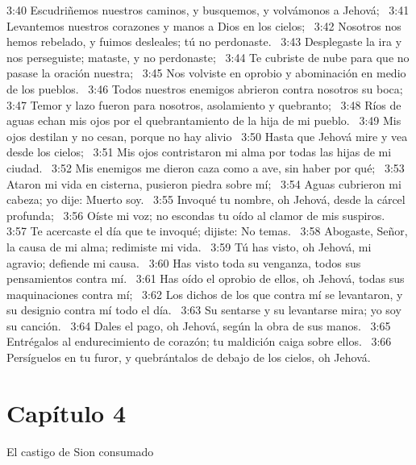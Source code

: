 3:40 Escudriñemos nuestros caminos, y busquemos, y volvámonos a Jehová;  
3:41 Levantemos nuestros corazones y manos a Dios en los cielos;  
3:42 Nosotros nos hemos rebelado, y fuimos desleales; tú no perdonaste.  
3:43 Desplegaste la ira y nos perseguiste; mataste, y no perdonaste;  
3:44 Te cubriste de nube para que no pasase la oración nuestra;  
3:45 Nos volviste en oprobio y abominación en medio de los pueblos.  
3:46 Todos nuestros enemigos abrieron contra nosotros su boca;  
3:47 Temor y lazo fueron para nosotros, asolamiento y quebranto;  
3:48 Ríos de aguas echan mis ojos por el quebrantamiento de la hija de mi pueblo.  
3:49 Mis ojos destilan y no cesan, porque no hay alivio  
3:50 Hasta que Jehová mire y vea desde los cielos;  
3:51 Mis ojos contristaron mi alma por todas las hijas de mi ciudad.  
3:52 Mis enemigos me dieron caza como a ave, sin haber por qué;  
3:53 Ataron mi vida en cisterna, pusieron piedra sobre mí;  
3:54 Aguas cubrieron mi cabeza; yo dije: Muerto soy.  
3:55 Invoqué tu nombre, oh Jehová, desde la cárcel profunda;  
3:56 Oíste mi voz; no escondas tu oído al clamor de mis suspiros.  
3:57 Te acercaste el día que te invoqué; dijiste: No temas.  
3:58 Abogaste, Señor, la causa de mi alma; redimiste mi vida.  
3:59 Tú has visto, oh Jehová, mi agravio; defiende mi causa.  
3:60 Has visto toda su venganza, todos sus pensamientos contra mí.  
3:61 Has oído el oprobio de ellos, oh Jehová, todas sus maquinaciones contra mí;  
3:62 Los dichos de los que contra mí se levantaron, y su designio contra mí todo el día.  
3:63 Su sentarse y su levantarse mira; yo soy su canción.  
3:64 Dales el pago, oh Jehová, según la obra de sus manos.  
3:65 Entrégalos al endurecimiento de corazón; tu maldición caiga sobre ellos.  
3:66 Persíguelos en tu furor, y quebrántalos de debajo de los cielos, oh Jehová. 
\section*{Capítulo 4 }
El castigo de Sion consumado  

